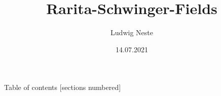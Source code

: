 

\title{Rarita-Schwinger-Fields}
\date{14.07.2021}
\author{Ludwig Neste}



\begin{frame}
	\titlepage
\end{frame}
\begin{frame}{Table of contents}
	[sections numbered]
	\tableofcontents[hideallsubsections]
\end{frame}



